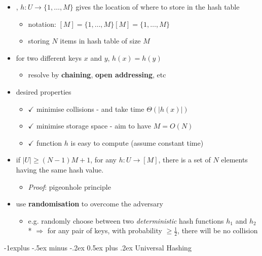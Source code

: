 \documentclass[10pt, landscape]{article}
\makeatletter
\renewcommand{\subsection}{\@startsection{subsection}{2}{0mm}%
  {-1explus -.5ex minus -.2ex}%
  {0.5ex plus .2ex}%
{\normalfont\normalsize\bfseries}}
\makeatother
\begin{document}
\begin{multicols*}{4}
  \begin{itemize}
    \item {}, $h:U \to \{1, \dots, M\}$ gives the location of where to store in the hash table
      \begin{itemize}
        \item notation: $[M] = \{ 1, \dots, M \}[M] = \{ 1, \dots, M \}$
        \item storing $N$ items in hash table of size $M$
      \end{itemize}
    \item {} for two different keys $x$ and $y$, $h(x) = h(y)$ 
      \begin{itemize}
        \item resolve by \textbf{chaining}, \textbf{open addressing}, etc
      \end{itemize}
    \item desired properties 
      \begin{itemize}
        \item $\checkmark$ minimise collisions -  and  take time $\Theta(\vert h(x) \vert)$
        \item $\checkmark$ minimise storage space - aim to have $M = O(N)$
        \item $\checkmark$ function $h$ is easy to compute (assume constant time)
      \end{itemize}
    \item if $\vert U \vert \geq (N-1) M + 1$, for any $h:U \to [M]$, there is a set of $N$ elements having the same hash value.
      \begin{itemize}
        \item \textit{Proof}: pigeonhole principle
      \end{itemize}
    \item use \textbf{randomisation} to overcome the adversary
      \begin{itemize}
        \item e.g. randomly choose between two \textit{deterministic} hash functions $h_1$ and $h_2$ 
          \\* $\Rightarrow$ for any pair of keys, with probability $\geq \frac{1}{2} $, there will be no collision
      \end{itemize}
  \end{itemize}

  \subsection{Universal Hashing}


\end{multicols*}
\end{document}
